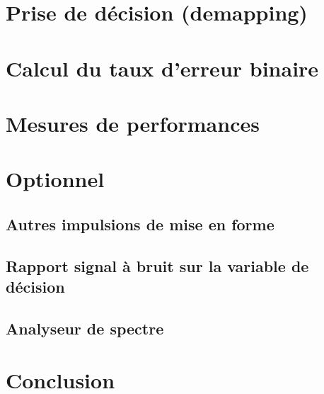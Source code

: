 \documentclass{acm_proc_article-sp}
\begin{document}
\section{Prise de décision (demapping)}


\section{Calcul du taux d'erreur binaire}


\section{Mesures de performances}


\section{Optionnel}
\subsection{Autres impulsions de mise en forme}
\subsection{Rapport signal à bruit sur la variable de décision}
\subsection{Analyseur de spectre}


\section{Conclusion}


\nocite{*}

\balancecolumns
\end{document}
